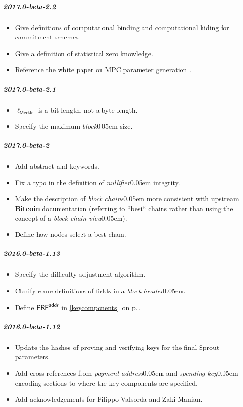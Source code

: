 \documentclass{article}
\renewcommand{\emph}[1]{\hspace{0.15em}{\fontfamily{pnc}\selectfont\scalebox{1.02}[0.999]{\textit{#1}}}\hspace{0.02em}}
\newcommand{\crossref}[1]{\autoref{#1}\, \emph{`\nameref*{#1}\kern -0.05em'} on p.\,\pageref*{#1}}
\newcommand{\introlist}{\needspace{15ex}}
\newcommand{\term}[1]{\textsl{#1}\kern 0.05em\xspace}
\newcommand{\termbf}[1]{\textbf{#1}\xspace}
\newcommand{\Bitcoin}{\termbf{Bitcoin}}
\newcommand{\block}{\term{block}}
\newcommand{\blockHeader}{\term{block header}}
\newcommand{\blockchains}{\term{block chains}}
\newcommand{\nullifier}{\term{nullifier}}
\newcommand{\paymentAddress}{\term{payment address}}
\newcommand{\spendingKey}{\term{spending key}}
\newcommand{\PRF}[2]{\mathsf{{PRF}^{#2}_\mathnormal{#1}}}
\newcommand{\PRFaddr}[1]{\PRF{#1}{addr}}
\newcommand{\MerkleHashLength}{\mathsf{\ell_{Merkle}}}
\begin{document}
\introlist
\subparagraph{2017.0-beta-2.2}

\begin{itemize}
    \item Give definitions of computational binding and computational hiding
          for commitment schemes.
    \item Give a definition of statistical zero knowledge.
    \item Reference the white paper on MPC parameter generation \cite{BGG2016}.
\end{itemize}

\introlist
\subparagraph{2017.0-beta-2.1}

\begin{itemize}
    \item $\MerkleHashLength$ is a bit length, not a byte length.
    \item Specify the maximum \block size.
\end{itemize}

\introlist
\subparagraph{2017.0-beta-2}

\begin{itemize}
    \item Add abstract and keywords.
    \item Fix a typo in the definition of \nullifier integrity.
    \item Make the description of \blockchains more consistent with
          upstream \Bitcoin documentation (referring to ``best`` chains
          rather than using the concept of a \term{block chain view}).
    \item Define how nodes select a best chain.
\end{itemize}

\introlist
\subparagraph{2016.0-beta-1.13}

\begin{itemize}
    \item Specify the difficulty adjustment algorithm.
    \item Clarify some definitions of fields in a \blockHeader.
    \item Define $\PRFaddr{}$ in \crossref{keycomponents}.
\end{itemize}

\introlist
\subparagraph{2016.0-beta-1.12}

\begin{itemize}
    \item Update the hashes of proving and verifying keys for the final Sprout parameters.
    \item Add cross references from \paymentAddress and \spendingKey encoding
          sections to where the key components are specified.
    \item Add acknowledgements for Filippo Valsorda and Zaki Manian.
\end{itemize}
\end{document}
